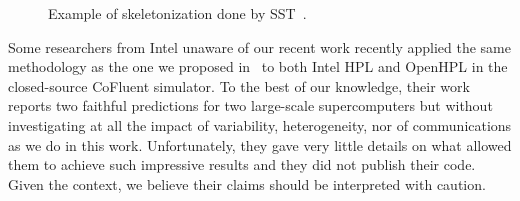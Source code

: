         \begin{figure}[htpb]
            \centering
            \caption{Example of skeletonization done by SST~\cite{sst_skeleton}.}%
            \label{fig:sst_skeleton}
        \end{figure}

        Some researchers from Intel unaware of our recent work recently applied the same methodology as the one we
        proposed in~\cite{cornebize:cluster19} to both Intel HPL and OpenHPL in the closed-source CoFluent
        simulator\cite{intel_20}. To the best of our knowledge, their work reports two faithful predictions for two
        large-scale supercomputers but without investigating at all the impact of variability, heterogeneity, nor of
        communications as we do in this work. Unfortunately, they gave very little details on what allowed them to
        achieve such impressive results and they did not publish their code. Given the context, we believe their claims
        should be interpreted with caution.

